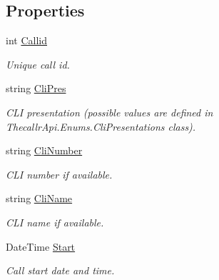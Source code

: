 \subsection*{Properties}
\begin{DoxyCompactItemize}
\item 
int \hyperlink{class_thecallr_api_1_1_objects_1_1_cdr_1_1_cdr_a52478907d35ef1b6206c04e5301fa660}{Callid}
\begin{DoxyCompactList}\small\item\em Unique call id. \end{DoxyCompactList}\item 
string \hyperlink{class_thecallr_api_1_1_objects_1_1_cdr_1_1_cdr_af269ebba752eaae2d7ce48ff1816a990}{Cli\+Pres}
\begin{DoxyCompactList}\small\item\em C\+L\+I presentation (possible values are defined in Thecallr\+Api.\+Enums.\+Cli\+Presentations class). \end{DoxyCompactList}\item 
string \hyperlink{class_thecallr_api_1_1_objects_1_1_cdr_1_1_cdr_a6b34d157641041475dd36cfcb8264dd0}{Cli\+Number}
\begin{DoxyCompactList}\small\item\em C\+L\+I number if available. \end{DoxyCompactList}\item 
string \hyperlink{class_thecallr_api_1_1_objects_1_1_cdr_1_1_cdr_a087b06034c7d5f67bcc4ea1239998f52}{Cli\+Name}
\begin{DoxyCompactList}\small\item\em C\+L\+I name if available. \end{DoxyCompactList}\item 
Date\+Time \hyperlink{class_thecallr_api_1_1_objects_1_1_cdr_1_1_cdr_a6c88b0e698d2f4bb2f10a44d21bc0d4d}{Start}
\begin{DoxyCompactList}\small\item\em Call start date and time. \end{DoxyCompactList}\item 

\end{DoxyCompactItemize}
